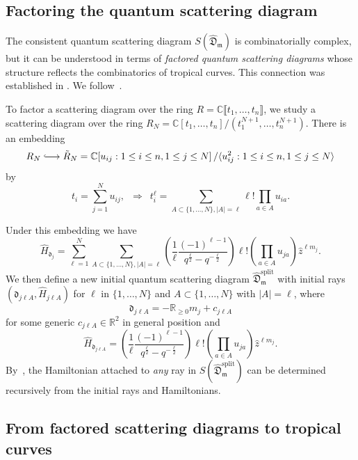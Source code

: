 \documentclass[11pt]{amsart}
\numberwithin{equation}{section}
\theoremstyle{plain}
\theoremstyle{remark}
\theoremstyle{definition}
\newcommand\fd{\mathfrak d}
\newcommand\fD{\mathfrak D}
\newcommand\fm{\mathfrak m}
\newcommand{\CC}{\mathbb{C}}
\newcommand{\RR}{\mathbb{R}}
\newcommand{\longhookrightarrow}{\lhook\joinrel\longrightarrow}
\begin{document}
\subsection{Factoring the quantum scattering diagram}
The consistent quantum scattering diagram $S(\hat{\fD}_{\fm})$ is combinatorially complex, but it can be understood in terms of \textit{factored quantum scattering diagrams} whose structure reflects the combinatorics of tropical curves. This connection was established in \cite{filippini2015block}. We follow~\cite[Section 6]{bousseau2020quantumtrop}.

To factor a scattering diagram over the ring $R = \mathbb{C} \llbracket t_1,\ldots,t_n \rrbracket$, we study a scattering diagram over the ring $R_N = \CC[t_1,\dots,t_n]/(t_1^{N+1},\dots,t_n^{N+1})$. There is an embedding
$$R_N \longhookrightarrow \tilde{R}_N = \CC[u_{ij} : 1 \leq i \leq n, 1 \leq j \leq N]\,/\langle u_{ij}^2 :  1 \leq i \leq n, 1 \leq j \leq N \rangle $$
by
$$t_{i} = \sum_{j=1}^N u_{ij}, \,\,\, \Longrightarrow \,\,\, t^{\ell}_{i} = \sum_{A \subset \{1,\dots,N\}, |A| = \ell} \ell! \prod_{a \in A} u_{i a}.$$

Under this embedding we have 
\[
\hat{H}_{\fd_j} =
\sum_{\ell = 1}^N \sum_{A \subset \{1,\dots,N\},|A|=\ell}\left(\frac{1}{\ell} \frac{(-1)^{\ell-1}}{q^{\frac{\ell}{2}}-q^{-\frac{\ell}{2}}}\right) \ell! \left(\prod_{a \in A}u_{ja} \right)\hat{z}^{\ell m_j}.
\]
We then define a new initial quantum scattering diagram $\hat{\fD}_{\fm}^{\mathrm{split}}$ with initial rays $(\fd_{j \ell A}, \hat{H}_{j \ell A})$ for $\ell$ in  $\{1,\dots, N\}$ and $A \subset \{1,\dots, N\}$ with $|A| = \ell$, where $$\fd_{j \ell A} = -\RR_{\geq 0}m_j + c_{j \ell A} $$ for some generic $c_{j \ell A} \in \RR^2$ in general position and
\[
\hat{H}_{\fd_{j \ell A}} =
\left(\frac{1}{\ell} \frac{(-1)^{\ell-1}}{q^{\frac{\ell}{2}}-q^{-\frac{\ell}{2}}}\right) \ell! \left(\prod_{a \in A}u_{ja} \right)\hat{z}^{\ell m_j}.
\]
By~\cite[Lemma 6.1]{bousseau2020quantumtrop}, the Hamiltonian attached to \emph{any} ray in $S(\hat{\fD}_{\fm}^{\mathrm{split}})$ can be determined recursively from the initial rays and Hamiltonians.  

\subsection{From factored scattering diagrams to tropical curves}
\end{document}

